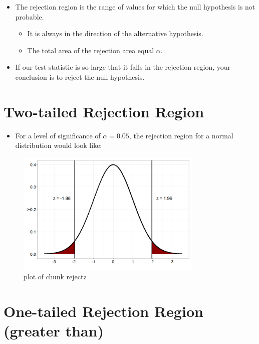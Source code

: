 \documentclass[12pt]{article}
\begin{document}
\begin{itemize}
\itemsep1pt\parskip0pt
\item
  The rejection region is the range of values for which the null
  hypothesis is not probable.

  \begin{itemize}
  \itemsep1pt\parskip0pt
  \item
    It is always in the direction of the alternative hypothesis.
  \item
    The total area of the rejection area equal \(\alpha\).
  \end{itemize}
\item
  If our test statistic is so large that it falls in the rejection
  region, your conclusion is to reject the null hypothesis.
\end{itemize}

\section{Two-tailed Rejection Region}\label{two-tailed-rejection-region}

\begin{itemize}
\itemsep1pt\parskip0pt
\item
  For a level of significance of \(\alpha = 0.05\), the rejection region
  for a normal distribution would look like:
\end{itemize}

\begin{figure}[H]
\centering
\includegraphics[width=3.5in]{figure/rejectz-1.png}
\caption{plot of chunk rejectz}
\end{figure}

\section{One-tailed Rejection Region (greater
than)}\label{one-tailed-rejection-region-greater-than}
\end{document}
